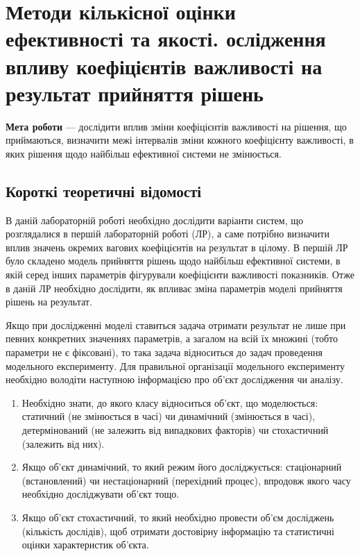\chapter[~]{Методи кількісної оцінки ефективності та якості.  ослідження впливу коефіцієнтів важливості
  на результат прийняття рішень}

\textbf{Мета роботи} --- дослідити вплив зміни коефіцієнтів важливості на рішення, що приймаються,
визначити межі інтервалів зміни кожного коефіцієнту важливості, в яких рішення щодо найбільш
ефективної системи не змінюється.


\section{Короткі теоретичні відомості}

В даній лабораторній роботі необхідно дослідити варіанти систем, що розглядалися в першій
лабораторній роботі (ЛР), а саме потрібно визначити вплив значень окремих вагових коефіцієнтів на
результат в цілому. В першій ЛР було складено модель прийняття рішень щодо найбільш ефективної
системи, в якій серед інших параметрів фігурували коефіцієнти важливості показників.  Отже в даній
ЛР необхідно дослідити, як впливає зміна параметрів моделі прийняття рішень на результат.

Якщо при дослідженні моделі ставиться задача отримати результат не лише при певних конкретних
значеннях параметрів, а загалом на всій їх множині (тобто параметри не є фіксовані), то така задача
відноситься до задач проведення модельного експерименту. Для правильної організації модельного
експерименту необхідно володіти наступною інформацією про об’єкт дослідження чи аналізу.

\begin{enumerate}
\item Необхідно знати, до якого класу відноситься об’єкт, що моделюється: статичний (не змінюється в
  часі) чи динамічний (змінюється в часі), детермінований (не залежить від випадкових факторів) чи
  стохастичний (залежить від них).
\item Якщо об’єкт динамічний, то який режим його досліджується: стаціонарний (встановлений) чи
  нестаціонарний (перехідний процес), впродовж якого часу необхідно досліджувати об’єкт тощо.
\item Якщо об’єкт стохастичний, то який необхідно провести об’єм досліджень (кількість дослідів),
  щоб отримати достовірну інформацію та статистичні оцінки характеристик об’єкта.
\end{enumerate}

